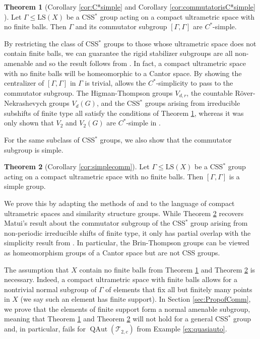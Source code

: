 \documentclass[12pt]{amsart}
\numberwithin{equation}{subsection}
\theoremstyle{definition}
\newtheorem{introthm}{Theorem}
\theoremstyle{definition}
\theoremstyle{remark}
\begin{document}
\begin{introthm}[Corollary \ref{cor:C*simple} and Corollary \ref{cor:commutatorisC*simple} ]\label{mainthm:C*simple}
     Let $\Gamma \leq \text{LS}(X)$ be a CSS$^*$ group acting on a compact ultrametric space with no finite balls. Then $\Gamma$ and its commutator subgroup $[\Gamma , \Gamma ]$ are $C^*$-simple.
\end{introthm}

By restricting the class of CSS$^*$ groups to those whose ultrametric space does not contain finite balls, we can guarantee the rigid stabilizer subgroups are all non-amenable and so the result follows from \cite[Corollary 1.3]{LeBoudecBon2018}.  In fact, a compact ultrametric space with no finite balls will be homeomorphic to a Cantor space. By showing the centralizer of $[\Gamma , \Gamma]$ in $\Gamma$ is trivial, \cite[Theorem 1.3]{Ursu2022} allows the $C^*$-simplicity to pass to the commutator subgroup. The Higman-Thompson groups $V_{d,r}$, the countable R\"{o}ver-Nekrashevych groups $V_d(G)$, and the CSS$^*$ groups arising from irreducible subshifts of finite type all satisfy the conditions of Theorem \ref{mainthm:C*simple}, whereas it was only shown that $V_2$ and $V_2(G)$ are $C^*$-simple in \cite{LeBoudecBon2018}.




For the same subclass of CSS$^*$ groups, we also show that the commutator subgroup is simple. 

\begin{introthm}[Corollary \ref{cor:simplecomm}]\label{mainthm:simplecomm}
     Let $\Gamma \leq \text{LS}(X)$ be a CSS$^*$ group acting on a compact ultrametric space with no finite balls. Then $[\Gamma,\Gamma]$ is a simple group. 
\end{introthm}

We prove this by adapting the methods of \cite{Matui20215SFT} and \cite{BleakEtAll2023} to the language of compact ultrametric spaces and similarity structure groups.  While Theorem \ref{mainthm:simplecomm} recovers Matui's result about the commutator subgroup of the CSS$^*$ group arising from non-periodic irreducible shifts of finite type, it only has partial overlap with the simplicity result from \cite{BleakEtAll2023}. In particular, the Brin-Thompson groups can be viewed as homeomorphism groups of a Cantor space but are not CSS groups. 

The assumption that $X$ contain no finite balls from Theorem \ref{mainthm:C*simple} and Theorem \ref{mainthm:simplecomm} is necessary. Indeed, a compact ultrametric space with finite balls allows for a nontrivial normal subgroup of $\Gamma$ of elements that fix all but finitely many points in $X$ (we say such an element has finite support). In Section \ref{sec:PropofComm}, we prove that the elements of finite support form a normal amenable subgroup, meaning that Theorem \ref{mainthm:C*simple} and Theorem \ref{mainthm:simplecomm} will not hold for a general CSS$^*$ group and, in particular, fails for $\operatorname{QAut}(\mathcal T_{2,c})$ from Example \ref{ex:quasiauto}.  
\end{document}
